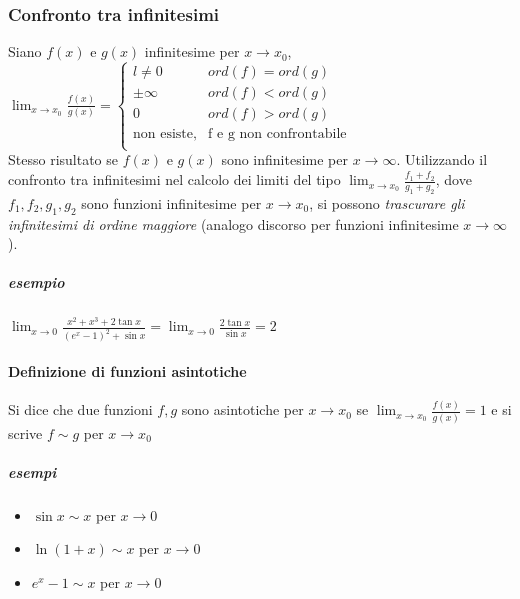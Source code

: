 \subsubsection{Confronto tra infinitesimi}
Siano $f(x)$ e $g(x)$ infinitesime per $x\to x_{0}$,\\
$\lim_{x\to x_0}\frac{f(x)}{g(x)}=
\begin{cases}
l\neq 0&ord(f)=ord(g)\\
\pm \infty&ord(f)<ord(g)\\
0&ord(f)>ord(g)\\
	\text{non esiste,} & \text{f e g non confrontabile} \\ 
\end{cases}
$\\
Stesso risultato se $f(x)$ e $g(x)$ sono infinitesime per $x\to \infty$. Utilizzando il confronto tra infinitesimi nel calcolo dei limiti del tipo $\lim_{x\to x_0}\frac{f_1+f_2}{g_1+g_2}$, dove $f_1,f_2,g_1,g_2$ sono funzioni infinitesime per $x\to x_0$, si possono {\color{blue} \em trascurare gli infinitesimi di ordine maggiore} (analogo discorso per funzioni infinitesime $x\to \infty$).
\subparagraph{esempio}
$\lim_{x\to 0}\frac{x^2+x^3+2\tan{x}}{(e^x-1)^2+\sin{x}}=\lim_{x\to 0}\frac{2\tan x}{\sin x}=2$
\paragraph{Definizione di funzioni asintotiche}
Si dice che due funzioni $f,g$ sono asintotiche per $x\to x_0$ se $\lim_{x\to x_0}\frac{f(x)}{g(x)}=1$ e si scrive $f\sim g$ per $x\to x_0$
\subparagraph{esempi}
\begin{itemize}
	\item $\sin x\sim x$ per $x\to 0$
	\item $\ln(1+x)\sim x$ per $x\to 0$
	\item $e^x-1\sim x$ per $x\to 0$ 
\end{itemize}

